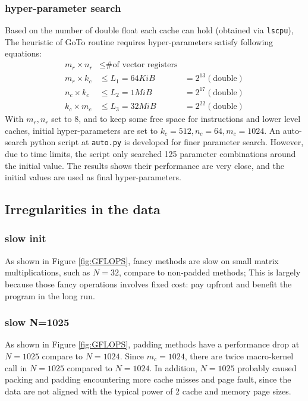 \documentclass[12pt]{article}
\begin{document}
\subsubsection{hyper-parameter search}
Based on the number of double float each cache can hold (obtained via \texttt{lscpu}),
The heuristic of GoTo routine requires
hyper-parameters satisfy following equations:
$$
\begin{aligned}
m_r \times n_r &\leq \text{\# of vector registers} \\
m_{r}\times k_{c}&\leq L_{1}=64KiB&=2^{13}\left( \text{double} \right)  \\ 
n_{c}\times k_{c}&\leq L_{2}=1MiB&=2^{17}\left( \text{double} \right)  \\ 
k_{c}\times m_{c}&\leq L_{3}=32MiB&=2^{22}\left( \text{double} \right)  
\end{aligned} 
$$
With $m_r, n_r$ set to 8, 
and to keep some free space for instructions and lower level caches,
initial hyper-parameters are set to $k_c = 512, n_c = 64, m_c=1024$.
An auto-search python script at \texttt{auto.py} is developed for finer parameter search.
However, due to time limits, the script only searched 125 parameter combinations around the initial value. 
The results shows their performance are very close, 
and the initial values are used as final hyper-parameters.

\subsection{Irregularities in the data}
\subsubsection{slow init } 
As shown in Figure \ref*{fig:GFLOPS},
fancy methods are slow on small matrix multiplications, such as $N = 32$, compare to non-padded methods;
This is largely because those fancy operations involves fixed cost:
pay upfront and benefit the program in the long run.

\subsubsection{slow N=1025}
As shown in Figure \ref*{fig:GFLOPS},
padding methods have a performance drop at $N=1025$ compare to $N=1024$.
Since $m_c = 1024$,
there are twice macro-kernel call in $N=1025$ compared to $N=1024$.
In addition, $N=1025$ probably caused packing and padding encountering more cache misses and page fault,
since the data are not aligned with the typical power of 2 cache and memory page sizes.
\end{document}
